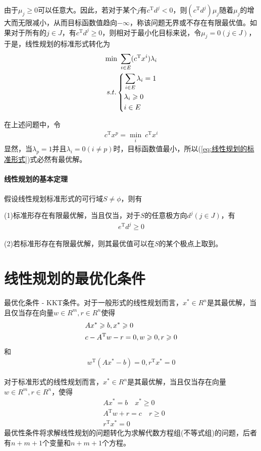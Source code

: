     由于${\mu}_j \geqslant 0$可以任意大。因此，若对于某个$j$有$c^\mathrm{T} d^j<0$，则$(c^\mathrm{T} d^j){\mu}_j$随着${\mu}_j$的增大而无限减小，从而目标函数值趋向$-\infty$，称该问题无界或不存在有限最优值。如果对于所有的$j\in J$，有$c^\mathrm{T}d^j \geqslant 0$，则相对于最小化目标来说，令$\mu_j = 0(j\in J)$，于是，线性规划的标准形式转化为
    \begin{align}
    \label{eq:线性规划的标准形式}
    \min\ \mathop {\sum}\limits_{i\in E}(c^\mathrm{T} x^i){\lambda}_i\\
    s.t.\left\{
    \begin{aligned}
    &\mathop{\sum}\limits_{i\in E}{\lambda}_i=1\\\notag
    &{\lambda}_i \geqslant 0\\\notag
    &i \in E\notag
    \end{aligned}
    \right.
    \end{align}
    \par
    在上述问题中，令
    \begin{align*}
    c^\mathrm{T} x^p=\mathop{\min}\limits_{i}\ c^\mathrm{T} x^i
    \end{align*}
    显然，当${\lambda}_p=1$并且${\lambda}_i=0(i \neq p)$时，目标函数值最小，所以(\ref{eq:线性规划的标准形式})式必然有最优解。
    \paragraph{线性规划的基本定理}
    假设线性规划标准形式的可行域$S\neq \phi$，则有\par
    (1)标准形存在有限最优解，当且仅当，对于$S$的任意极方向$d^j(j \in J)$，有
    \begin{align*}
    e^\mathrm{T} d^j \geqslant 0
    \end{align*}
    \par
    (2)若标准形存在有限最优解，则其最优值可以在$S$的某个极点上取到。
\section{线性规划的最优化条件}
    \par
    最优化条件 - KKT条件。对于一般形式的线性规划而言，$x^* \in R^n$是其最优解，当且仅当存在向量$w \in R^m,r \in R^n$使得
    \begin{align}
    \label{eq:线性规划的最优化条件1}
    &Ax^* \geqslant b,x^* \geqslant 0 \notag \\
    &c-A^\mathrm{T} w-r = 0,w \geqslant 0,r \geqslant 0
    \end{align}
    和
    \begin{align}
    \label{eq:线性规划的最优化条件2}
    w^\mathrm{T} (Ax^*-b) = 0,r^\mathrm{T} x^*=0
    \end{align}
    \par
    对于标准形式的线性规划而言，$x^* \in R^n$是其最优解，当且仅当存在向量$w \in R^m,r \in R^n$，使得
    \begin{align*}
    &Ax^* = b \quad x^* \geqslant 0 \\
    &A^\mathrm{T} w+r =c \quad r \geqslant 0 \\
    &r^\mathrm{T} x^*=0
    \end{align*}
    最优性条件将求解线性规划的问题转化为求解代数方程组(不等式组)的问题，后者有$n+m+1$个变量和$n+m+1$个方程。
